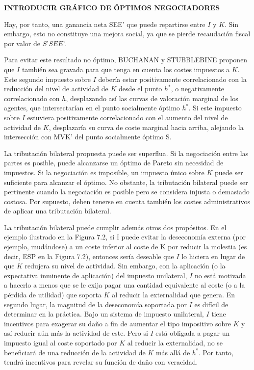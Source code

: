 \documentclass[10pt,a4paper]{article}
\begin{document}
\textbf{INTRODUCIR GRÁFICO DE ÓPTIMOS NEGOCIADORES}

Hay, por tanto, una ganancia neta SEE’ que puede repartirse entre $I$ y $K$. Sin embargo, esto no constituye una mejora social, ya que se pierde recaudación fiscal por valor de $S’S E E’$. 

Para evitar este resultado no óptimo, BUCHANAN y STUBBLEBINE proponen que $I$ también sea gravada para que tenga en cuenta los costes impuestos a $K$. Este segundo impuesto sobre $I$ debería estar positivamente correlacionado con la reducción del nivel de actividad de $K$ desde el punto $h^*$, o negativamente correlacionado con $h$, desplazando así las curvas de valoración marginal de los agentes, que intersectarían en el punto socialmente óptimo $h^º$. Si este impuesto sobre $I$ estuviera positivamente correlacionado con el aumento del nivel de actividad de $K$, desplazaría su curva de coste marginal hacia arriba, alejando la intersección con MVK’ del punto socialmente óptimo S.

La tributación bilateral propuesta puede ser superflua. Si la negociación entre las partes es posible, puede alcanzarse un óptimo de Pareto sin necesidad de impuestos. Si la negociación es imposible, un impuesto único sobre $K$ puede ser suficiente para alcanzar el óptimo. No obstante, la tributación bilateral puede ser pertinente cuando la negociación es posible pero se considera injusta o demasiado costosa. Por supuesto, deben tenerse en cuenta también los costes administrativos de aplicar una tributación bilateral.

La tributación bilateral puede cumplir además otros dos propósitos. En el ejemplo ilustrado en la Figura 7.2, si I puede evitar la deseconomía externa (por ejemplo, mudándose) a un coste inferior al coste de K por reducir la molestia (es decir, ESP en la Figura 7.2), entonces sería deseable que $I$ lo hiciera en lugar de que $K$ redujera su nivel de actividad. Sin embargo, con la aplicación (o la expectativa inminente de aplicación) del impuesto unilateral, $I$ no está motivada a hacerlo a menos que se le exija pagar una cantidad equivalente al coste (o a la pérdida de utilidad) que soporta $K$ al reducir la externalidad que genera. En segundo lugar, la magnitud de la deseconomía soportada por $I$ es difícil de determinar en la práctica. Bajo un sistema de impuesto unilateral, $I$ tiene incentivos para exagerar su daño a fin de aumentar el tipo impositivo sobre $K$ y así reducir aún más la actividad de este. Pero si $I$ está obligada a pagar un impuesto igual al coste soportado por $K$ al reducir la externalidad, no se beneficiará de una reducción de la actividad de $K$ más allá de $h^º$. Por tanto, tendrá incentivos para revelar su función de daño con veracidad.
\end{document}

